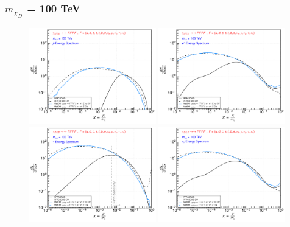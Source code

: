 \documentclass[epj,nopacs,fleqn]{svjour}
\begin{document}
\subsubsection{ $m_{\chi_D}$ = 100 TeV}
\begin{figure}[!b]
\centering
\subfigure
{ \includegraphics[width=0.49\textwidth]{Fig/xdxd_FFFF_WZ/100_antiprotons_FFFF_100.pdf}}
\subfigure
{ \includegraphics[width=0.49\textwidth]{Fig/xdxd_FFFF_WZ/100_positrons_FFFF_100.pdf}}
\subfigure
{ \includegraphics[width=0.49\textwidth]{Fig/xdxd_FFFF_WZ/100_gammas_FFFF_100.pdf}}
\subfigure
{ \includegraphics[width=0.49\textwidth]{Fig/xdxd_FFFF_WZ/100_neutrinos_e_FFFF_100.pdf}}

\end{figure}
\end{document}

